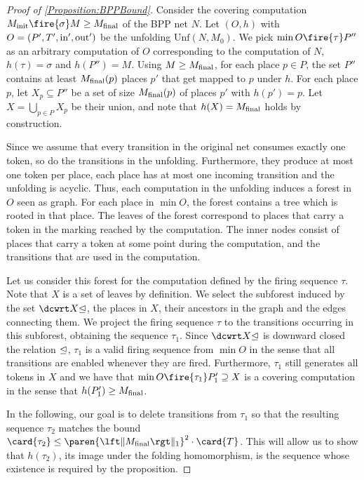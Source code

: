 \documentclass[../../diss.tex]{subfiles}
\begin{document}
\begin{proof}[Proof of \cref{Proposition:BPPBound}]
    Consider the covering computation $\Minit \fire{\sigma} M \geq \Mfinal$ of the BPP net $N$.
    Let $(O, h)$ with $O=(P', T', \text{in}',\text{out}')$ be the unfolding $\text{Unf}(N, M_0)$.
    We pick $\min O \fire{\tau} P''$ as an arbitrary computation of $O$ corresponding to the computation of $N$, \ie $h(\tau) = \sigma$ and $h(P'') = M$.
    Using $M \geq M_{\text{final}}$, for each place $p \in P$, the set $P''$ contains at least $M_{\text{final}}(p)$ places $p'$ that get mapped to $p$ under $h$.
    For each place $p$, let $X_p \subseteq P''$ be a set of size $M_{\text{final}}(p)$ of places $p'$ with $h(p') = p$.
    Let $X = \bigcup_{p \in P} X_p$ be their union, and note that $h(X) = M_{\text{final}}$ holds by construction.

    Since we assume that every transition in the original net consumes exactly one token, so do the transitions in the unfolding.
    Furthermore, they produce at most one token per place, each place has at most one incoming transition and the unfolding is acyclic.
    Thus, each computation in the unfolding induces a forest in $O$ seen as graph.
    For each place in $\min O$, the forest contains a tree which is rooted in that place.
    The leaves of the forest correspond to places that carry a token in the marking reached by the computation.
    The inner nodes consist of places that carry a token at some point during the computation, and the transitions that are used in the computation.

    Let us consider this forest for the computation defined by the firing sequence $\tau$.
    Note that $X$ is a set of leaves by definition.
    We select the subforest induced by the set $\causalpredec{X}$, \ie the places in $X$, their ancestors in the graph and the edges connecting them.
    We project the firing sequence $\tau$ to the transitions occurring in this subforest, obtaining the sequence $\tau_1$.
    Since $\causalpredec{X}$ is downward closed \wrt the relation $\trianglelefteq$, $\tau_1$ is a valid firing sequence from $\min O$ in the sense that all transitions are enabled whenever they are fired.
    Furthermore, $\tau_1$ still generates all tokens in $X$ and we have that $\min O \fire{\tau_1} P_1' \supseteq X$ is a covering computation in the sense that $h(P_1') \geq M_{\text{final}}$.

    In the following, our goal is to delete transitions from $\tau_1$ so that the resulting sequence $\tau_2$ matches the bound $\card{\tau_2} \leq \paren{\normone{\Mfinal}}^2 \cdot \card{T}$.
    This will allow us to show that $h(\tau_2)$, its image under the folding homomorphism, is the sequence whose existence is required by the proposition.


\end{proof}
\end{document}

